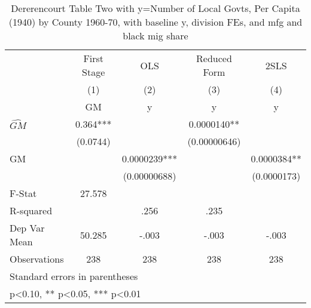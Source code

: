 \begin{table}[htbp]\centering
\def\sym#1{\ifmmode^{#1}\else\(^{#1}\)\fi}
\caption{Dererencourt Table Two with y=Number of Local Govts, Per Capita (1940) by County 1960-70, with baseline y, division FEs, and mfg and black mig share}
\begin{tabular}{l*{4}{c}}
\toprule
                    & First Stage   &         OLS   &Reduced Form   &        2SLS   \\
                    &\multicolumn{1}{c}{(1)}&\multicolumn{1}{c}{(2)}&\multicolumn{1}{c}{(3)}&\multicolumn{1}{c}{(4)}\\
                    &\multicolumn{1}{c}{GM}&\multicolumn{1}{c}{y}&\multicolumn{1}{c}{y}&\multicolumn{1}{c}{y}\\
\midrule
$\hat{GM}$          &       0.364***&               &   0.0000140** &               \\
                    &    (0.0744)   &               &(0.00000646)   &               \\
\addlinespace
GM                  &               &   0.0000239***&               &   0.0000384** \\
                    &               &(0.00000688)   &               & (0.0000173)   \\
\midrule
F-Stat              &      27.578   &               &               &               \\
R-squared           &               &        .256   &        .235   &               \\
Dep Var Mean        &      50.285   &       -.003   &       -.003   &       -.003   \\
Observations        &         238   &         238   &         238   &         238   \\
\bottomrule
\multicolumn{5}{l}{\footnotesize Standard errors in parentheses}\\
\multicolumn{5}{l}{\footnotesize * p<0.10, ** p<0.05, *** p<0.01}\\
\end{tabular}
\end{table}
